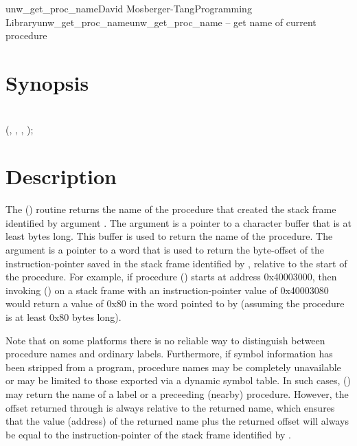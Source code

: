 \documentclass{article}
\begin{document}
\begin{Name}{3}{unw\_get\_proc\_name}{David Mosberger-Tang}{Programming Library}{unw\_get\_proc\_name}unw\_get\_proc\_name -- get name of current procedure
\end{Name}

\section{Synopsis}

\\

 (, ,  , );\\

\section{Description}

The () routine returns the name of the
procedure that created the stack frame identified by argument
.  The  argument is a pointer to a character buffer
that is at least  bytes long.  This buffer is used to return
the name of the procedure.  The  argument is a pointer to a
word that is used to return the byte-offset of the instruction-pointer
saved in the stack frame identified by , relative to the start
of the procedure.  For example, if procedure () starts at
address 0x40003000, then invoking () on a
stack frame with an instruction-pointer value of 0x40003080 would
return a value of 0x80 in the word pointed to by  (assuming
the procedure is at least 0x80 bytes long).

Note that on some platforms there is no reliable way to distinguish
between procedure names and ordinary labels.  Furthermore, if symbol
information has been stripped from a program, procedure names may be
completely unavailable or may be limited to those exported via a
dynamic symbol table.  In such cases, ()
may return the name of a label or a preceeding (nearby) procedure.
However, the offset returned through  is always relative to
the returned name, which ensures that the value (address) of the
returned name plus the returned offset will always be equal to the
instruction-pointer of the stack frame identified by .
\end{document}
